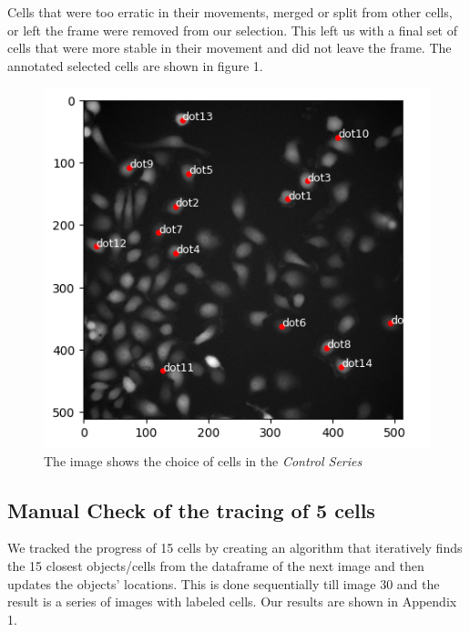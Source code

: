 \documentclass{article}
\begin{document}
Cells that were too erratic in their movements, merged or split from other cells, or left the frame were removed from our selection. This left us with a final set of cells that were more stable in their movement and did not leave the frame. The annotated selected cells are shown in figure 1. 

\begin{figure}[h!]
\centering
\includegraphics[width=0.75\linewidth]{Images/final_points_chosen.png}
\caption{\label{fig:ChoiceofCells-ControlSeries}The image shows the choice of cells in the \emph{Control Series}}
\end{figure}


\subsection*{Manual Check of the tracing of 5 cells}

We tracked the progress of 15 cells by creating an algorithm that iteratively finds the 15 closest objects/cells from the dataframe of the next image and then updates the objects' locations. This is done sequentially till image 30 and the result is a series of images with labeled cells. Our results are shown in Appendix 1. 
\end{document}
